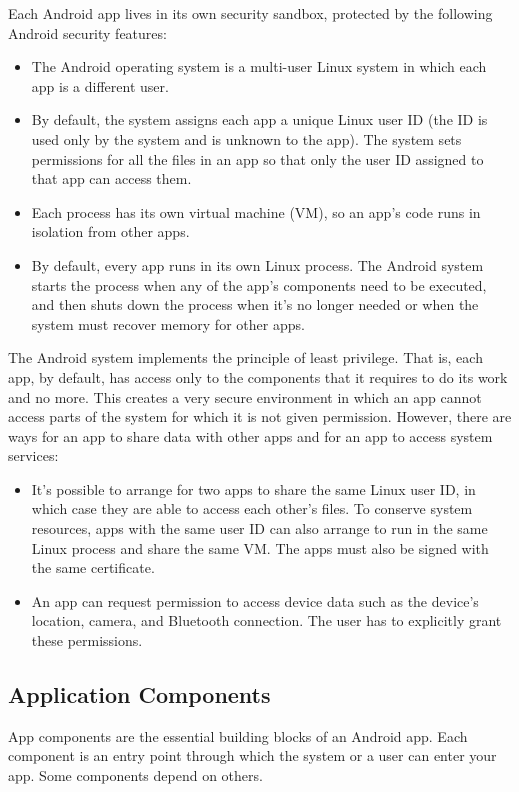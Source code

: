 \documentclass[14pt]{report}
\begin{document}
			Each Android app lives in its own security sandbox, protected by the following Android security features:
			\begin{itemize}
				\item The Android operating system is a multi-user Linux system in which each app is a different user.
				\item By default, the system assigns each app a unique Linux user ID (the ID is used only by the system and is unknown to the app). The system sets permissions for all the files in an app so that only the user ID assigned to that app can access them.
				\item Each process has its own virtual machine (VM), so an app's code runs in isolation from other apps.
				\item By default, every app runs in its own Linux process. The Android system starts the process when any of the app's components need to be executed, and then shuts down the process when it's no longer needed or when the system must recover memory for other apps.

			\end{itemize}

			The Android system implements the principle of least privilege. That is, each app, by default, has access only to the components that it requires to do its work and no more. This creates a very secure environment in which an app cannot access parts of the system for which it is not given permission. However, there are ways for an app to share data with other apps and for an app to access system services:

			\begin{itemize}
				\item It's possible to arrange for two apps to share the same Linux user ID, in which case they are able to access each other's files. To conserve system resources, apps with the same user ID can also arrange to run in the same Linux process and share the same VM. The apps must also be signed with the same certificate.
				\item An app can request permission to access device data such as the device's location, camera, and Bluetooth connection. The user has to explicitly grant these permissions.
			\end{itemize}
			\subsection{Application Components}

				App components are the essential building blocks of an Android app. Each component is an entry point through which the system or a user can enter your app. Some components depend on others.\\
				
\end{document}
